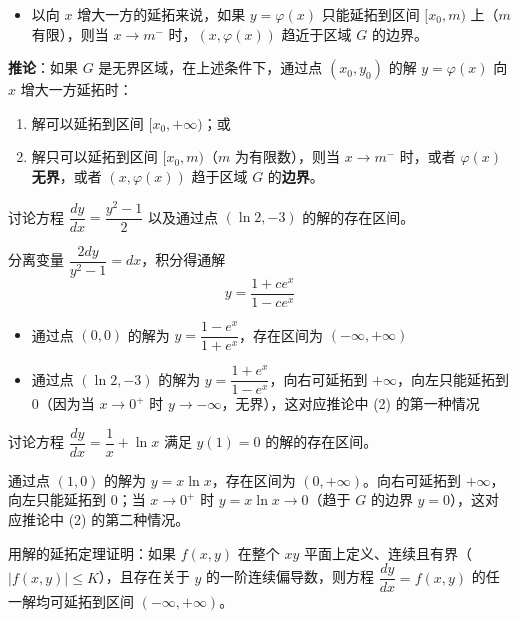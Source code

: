 \begin{itemize}
    \item 以向 $x$ 增大一方的延拓来说，如果 $y = \varphi(x)$ 只能延拓到区间 $[x_0, m)$ 上（$m$ 有限），则当 $x \to m^-$ 时，$(x, \varphi(x))$ 趋近于区域 $G$ 的边界。
\end{itemize}

\textbf{推论}：如果 $G$ 是无界区域，在上述条件下，通过点 $(x_0, y_0)$ 的解 $y = \varphi(x)$ 向 $x$ 增大一方延拓时：
\begin{enumerate}
    \item 解可以延拓到区间 $[x_0, +\infty)$；或
    \item 解只可以延拓到区间 $[x_0, m)$（$m$ 为有限数），则当 $x \to m^-$ 时，或者 $\varphi(x)$ \textbf{无界}，或者 $(x, \varphi(x))$ 趋于区域 $G$ 的\textbf{边界}。
\end{enumerate}

\begin{example}
讨论方程 $\dfrac{dy}{dx} = \dfrac{y^2 - 1}{2}$ 以及通过点 $(\ln 2, -3)$ 的解的存在区间。
\end{example}

\begin{solution}
分离变量 $\dfrac{2dy}{y^2-1} = dx$，积分得通解
$$y = \frac{1 + ce^x}{1 - ce^x}$$

\begin{itemize}
    \item 通过点 $(0,0)$ 的解为 $y = \dfrac{1 - e^x}{1 + e^x}$，存在区间为 $(-\infty, +\infty)$
    \item 通过点 $(\ln 2, -3)$ 的解为 $y = \dfrac{1 + e^x}{1 - e^x}$，向右可延拓到 $+\infty$，向左只能延拓到 $0$（因为当 $x \to 0^+$ 时 $y \to -\infty$，无界），这对应推论中 (2) 的第一种情况
\end{itemize}
\end{solution}

\begin{example}
讨论方程 $\dfrac{dy}{dx} = \dfrac{1}{x} + \ln x$ 满足 $y(1) = 0$ 的解的存在区间。
\end{example}

\begin{solution}
通过点 $(1,0)$ 的解为 $y = x\ln x$，存在区间为 $(0, +\infty)$。向右可延拓到 $+\infty$，向左只能延拓到 $0$；当 $x \to 0^+$ 时 $y = x\ln x \to 0$（趋于 $G$ 的边界 $y = 0$），这对应推论中 (2) 的第二种情况。
\end{solution}

\begin{example}
用解的延拓定理证明：如果 $f(x,y)$ 在整个 $xy$ 平面上定义、连续且有界（$|f(x,y)| \le K$），且存在关于 $y$ 的一阶连续偏导数，则方程 $\dfrac{dy}{dx} = f(x,y)$ 的任一解均可延拓到区间 $(-\infty, +\infty)$。
\end{example}

